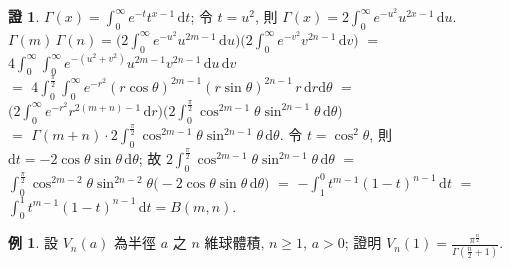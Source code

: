 \documentclass[12pt]{extarticle}
\newcommand{\ds}{\displaystyle}
\theoremstyle{definition}
\newtheorem*{ex}{例}
\newtheorem*{prf}{證}
\begin{document}
\begin{prf}
  $\ds\Gamma(x) = \int_0^\infty\!\!e^{-t}t^{x - 1}\,\mathrm{d}t$; 令 $t = u^2$, 則 $\ds\Gamma(x) = 2\int_0^\infty\!\!e^{-u^2}u^{2x - 1}\,\mathrm{d}u$. \\ $\ds\Gamma(m)\,\Gamma(n) = \bigg(2\int_0^\infty\!\!e^{-u^2}u^{2m - 1}\,\mathrm{d}u\bigg)\bigg(2\int_0^\infty\!\!e^{-v^2}v^{2n - 1}\,\mathrm{d}v\bigg)$ $=$ $\ds 4\int_0^\infty\!\!\!\int_0^\infty\!\!e^{-(u^2 + v^2)}u^{2m - 1}v^{2n - 1}\,\mathrm{d}u\,\mathrm{d}v$ \\ $=$ $\ds 4\int_0^{\frac{\pi}{2}}\!\!\!\int_0^\infty\!\!e^{-r^2}(r\cos\theta)^{2m - 1}(r\sin\theta)^{2n - 1}\,r\,\mathrm{d}r\mathrm{d}\theta$ $=$ $\ds\bigg(2\int_0^\infty\!\!e^{-r^2}r^{2(m + n) - 1}\,\mathrm{d}r\bigg)\bigg(2\int_0^{\frac{\pi}{2}}\!\!\cos^{2m - 1}\theta\sin^{2n - 1}\theta\,\mathrm{d}\theta\bigg)$ \\$=$ $\ds\Gamma(m + n)\cdot 2\int_0^{\frac{\pi}{2}}\!\!\cos^{2m - 1}\theta\sin^{2n - 1}\theta\,\mathrm{d}\theta$. 令 $t = \cos^2\theta$, 則 $\mathrm{d}t = -2\cos\theta\sin\theta\,\mathrm{d}\theta$; 故 $\ds 2\int_0^{\frac{\pi}{2}}\!\!\cos^{2m - 1}\theta\sin^{2n - 1}\theta\,\mathrm{d}\theta$ $=$ $\ds\int_0^{\frac{\pi}{2}}\!\!\cos^{2m - 2}\theta\sin^{2n - 2}\theta\big(-2\cos\theta\sin\theta\,\mathrm{d}\theta\big)$ $=$ $\ds-\int_1^0 t^{m - 1}(1 - t)^{n - 1}\,\mathrm{d}t$ $=$ $\ds\int_0^1 t^{m - 1}(1 - t)^{n - 1}\,\mathrm{d}t = B(m, n)$.
\end{prf}

\begin{ex}
  設 $V_n(a)$ 為半徑 $a$ 之 $n$ 維球體積, $n \geqslant 1$, $a > 0$; 證明 $\ds V_n(1) = \frac{\pi^{\frac{n}{2}}}{\Gamma(\frac{n}{2} + 1)}$.
\end{ex}
\end{document}
